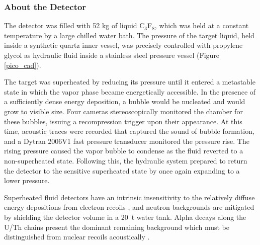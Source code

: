 \documentclass[10pt]{article}
\begin{document}
\subsubsection{About the Detector}

The detector was filled with 52 kg of liquid C$_3$F$_8$, which was held at a constant temperature by a large chilled water bath. The pressure of the target liquid, held inside a synthetic quartz inner vessel, was precisely controlled with propylene glycol as hydraulic fluid inside a stainless steel pressure vessel (Figure \ref{pico_cad}).

The target was superheated by reducing its pressure until it entered a metastable state in which the vapor phase became energetically accessible. In the presence of a sufficiently dense energy deposition, a bubble would be nucleated and would grow to visible size. Four cameras stereoscopically monitored the chamber for these bubbles, issuing a recompression trigger upon their appearance. At this time, acoustic traces were recorded that captured the sound of bubble formation, and a Dytran 2006V1 fast pressure transducer \cite{amole_thesis} monitored the pressure rise. The rising pressure caused the vapor bubble to condense as the fluid reverted to a non-superheated state. Following this, the hydraulic system prepared to return the detector to the sensitive superheated state by once again expanding to a lower pressure.

Superheated fluid detectors have an intrinsic insensitivity to the relatively diffuse energy depositions from electron recoils \cite{pico}, and neutron backgrounds are mitigated by shielding the detector volume in a 20~t water tank. Alpha decays along the U/Th chains present the dominant remaining background which must be distinguished from nuclear recoils acoustically \cite{isotopes}.
\end{document}
